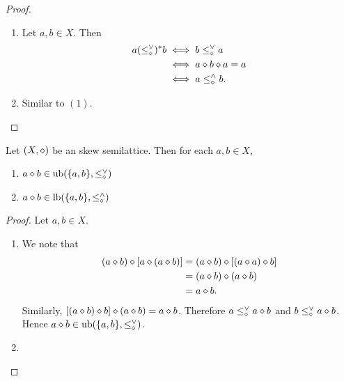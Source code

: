 \documentclass{book}
\begin{document}
	\begin{proof}\
		\begin{enumerate}
			\item Let $a,b \in X$. Then 
			\begin{align*}
				a (\leq^{\vee}_{\diamond})^* b 
				& \iff b \leq^{\vee}_{\diamond} a \\
				& \iff a \diamond b \diamond a = a \\
				& \iff a \leq^{\wedge}_{\diamond} b.
			\end{align*}
			\item Similar to $(1)$.
		\end{enumerate}
	\end{proof}
	
	\begin{ex} 
		Let $(X, \diamond)$ be an skew semilattice. Then for each $a,b \in X$, 
		\begin{enumerate}
			\item $a \diamond b \in \operatorname{ub}( \{a,b\}, \leq_{\diamond}^{\vee})$
			\item $a \diamond b \in \operatorname{lb}( \{a,b\}, \leq_{\diamond}^{\wedge})$
		\end{enumerate}
	\end{ex}
	
	\begin{proof} 
		Let $a,b \in X$.
		\begin{enumerate}
			\item 
			We note that 
			\begin{align*}
				(a \diamond b) \diamond [a \diamond (a \diamond b) ]
				& = (a \diamond b) \diamond [(a \diamond a) \diamond b] \\
				& = (a \diamond b) \diamond (a \diamond b) \\
				& = a \diamond b. 
			\end{align*}
			Similarly, $[(a \diamond b) \diamond b] \diamond (a \diamond b) = a \diamond b$. Therefore $a \leq_{\diamond}^{\vee} a \diamond b$ and $b \leq_{\diamond}^{\vee} a \diamond b$. Hence $a \diamond b \in \operatorname{ub}( \{a,b\}, \leq_{\diamond}^{\vee})$.
			\item \tcr{FINISH!!!}
		\end{enumerate}
	\end{proof}
	
	
	
	
	
	
	
	
	
	
	
	
	
	
	
	
	
\end{document}
